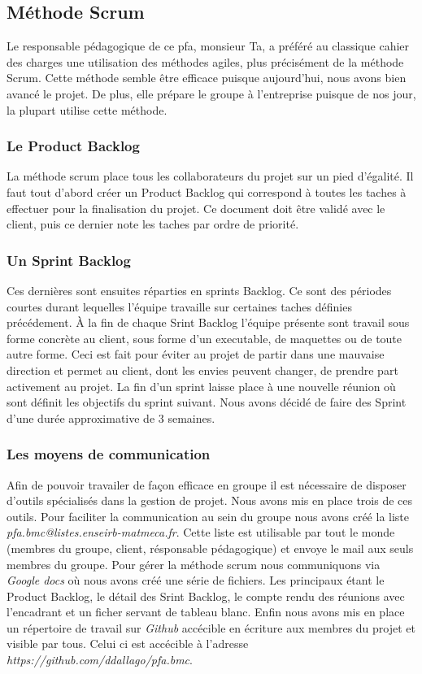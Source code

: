 \subsection{Méthode Scrum}
Le responsable pédagogique de ce pfa, monsieur Ta, a préféré au classique cahier des charges une utilisation des méthodes agiles, plus précisément de la méthode Scrum.
Cette méthode semble être efficace puisque aujourd'hui, nous avons bien avancé le projet. De plus, elle prépare le groupe à l'entreprise puisque de nos jour, la plupart utilise cette méthode.



\subsubsection*{Le Product Backlog}
La méthode scrum place tous les collaborateurs du projet sur un pied d'égalité. Il faut tout d'abord créer un Product Backlog qui correspond à toutes les taches à effectuer pour la finalisation du projet.
Ce document doit être validé avec le client, puis ce dernier note les taches par ordre de priorité.

\subsubsection*{Un Sprint Backlog}
Ces dernières sont ensuites réparties en sprints Backlog. Ce sont des périodes courtes durant lequelles l'équipe travaille sur certaines taches définies précédement. 
À la fin de chaque Srint Backlog l'équipe présente sont travail sous forme concrète au client, sous forme d'un executable, de maquettes ou de toute autre forme.
Ceci est fait pour éviter au projet de partir dans une mauvaise direction et permet au client, dont les envies peuvent changer, de prendre part activement au projet.
La fin d'un sprint laisse place à une nouvelle réunion où sont définit les objectifs du sprint suivant.
Nous avons décidé de faire des Sprint d'une durée approximative de 3 semaines.

\subsubsection*{Les moyens de communication}
Afin de pouvoir travailer de façon efficace en groupe il est nécessaire de disposer d'outils spécialisés dans la gestion de projet.
Nous avons mis en place trois de ces outils.
Pour faciliter la communication au sein du groupe nous avons créé la liste \textit{pfa.bmc@listes.enseirb-matmeca.fr}. Cette liste est utilisable par tout le monde (membres du groupe, client, résponsable pédagogique) et envoye le mail aux seuls membres du groupe.
Pour gérer la méthode scrum nous communiquons via \textit{Google docs} où nous avons créé une série de fichiers. Les principaux étant le Product Backlog, le détail des Srint Backlog, le compte rendu des réunions avec l'encadrant et un ficher servant de tableau blanc.
Enfin nous avons mis en place un répertoire de travail sur \textit{Github} accécible en écriture aux membres du projet et visible par tous. Celui ci est accécible à l'adresse \textit{https://github.com/ddallago/pfa.bmc}.

